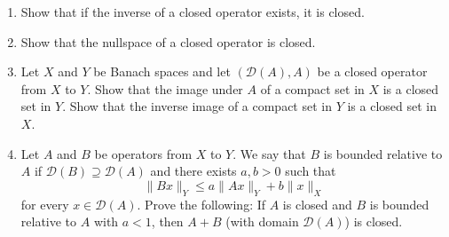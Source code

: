 \begin{enumerate}[label=\thesection.\arabic*.,ref=\thesection.\arabic*,start=1,series=book-problems]
\item\label{ex:inverse-of-closed-operator-closed} Show that if the inverse of a closed operator exists, it is closed.

\item\label{ex:closed-operator-null-space-closed} Show that the nullspace of a closed operator is closed.

\item\label{ex:closed-operator-compact-images-and-preimages} Let $X$ and $Y$ be Banach spaces and let $(\mathcal{D}(A),A)$ be a closed operator from $X$ to $Y$. Show that the image under $A$ of a compact set in $X$ is a closed set in $Y$. Show that the inverse image of a compact set in $Y$ is a closed set in $X$.

\item\label{ex:relative-bound-closed-operator-sum} Let $A$ and $B$ be operators from $X$ to $Y$. We say that $B$ is bounded relative to $A$ if $\mathcal{D}(B)\supseteq\mathcal{D}(A)$ and there exists $a,b>0$ such that\[\|Bx\|_Y\leq a\|Ax\|_Y+b\|x\|_X\]for every $x\in\mathcal{D}(A)$. Prove the following: If $A$ is closed and $B$ is bounded relative to $A$ with $a<1$, then $A+B$ (with domain $\mathcal{D}(A)$) is closed.

\end{enumerate}
